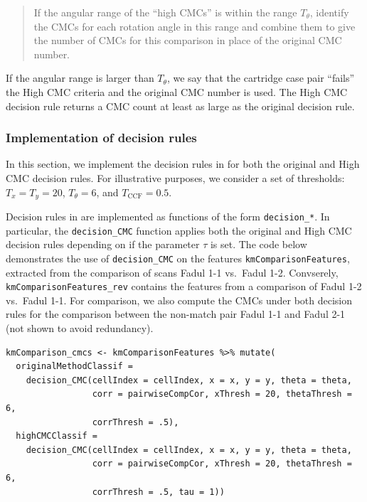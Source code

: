 \begin{quote}
If the angular range of the ``high CMCs'' is within the range \(T_\theta\), identify the CMCs for each rotation angle in this range and combine them to give the number of CMCs for this comparison in place of the original CMC number.
\end{quote}

If the angular range is larger than \(T_\theta\), we say that the cartridge case pair ``fails'' the High CMC criteria and the original CMC number is used.
The High CMC decision rule returns a CMC count at least as large as the original decision rule.

\hypertarget{decisionRuleImplementation}{%
\subsubsection{Implementation of decision rules}\label{decisionRuleImplementation}}

In this section, we implement the decision rules in  for both the original and High CMC decision rules.
For illustrative purposes, we consider a set of thresholds: \(T_x = T_y = 20\), \(T_{\theta} = 6\), and \(T_{\text{CCF}} = 0.5\).

Decision rules in  are implemented as functions of the form \texttt{decision\_*}.
In particular, the \texttt{decision\_CMC} function applies both the original and High CMC decision rules depending on if the parameter \(\tau\) is set.
The code below demonstrates the use of \texttt{decision\_CMC} on the features \texttt{kmComparisonFeatures}, extracted from the comparison of scans Fadul 1-1 vs.~Fadul 1-2.
Convserely, \texttt{kmComparisonFeatures\_rev} contains the features from a comparison of Fadul 1-2 vs.~Fadul 1-1.
For comparison, we also compute the CMCs under both decision rules for the comparison between the non-match pair Fadul 1-1 and Fadul 2-1 (not shown to avoid redundancy).

\begin{verbatim}
kmComparison_cmcs <- kmComparisonFeatures %>% mutate(
  originalMethodClassif =
    decision_CMC(cellIndex = cellIndex, x = x, y = y, theta = theta,
                 corr = pairwiseCompCor, xThresh = 20, thetaThresh = 6,
                 corrThresh = .5),
  highCMCClassif =
    decision_CMC(cellIndex = cellIndex, x = x, y = y, theta = theta,
                 corr = pairwiseCompCor, xThresh = 20, thetaThresh = 6,
                 corrThresh = .5, tau = 1))
\end{verbatim}

